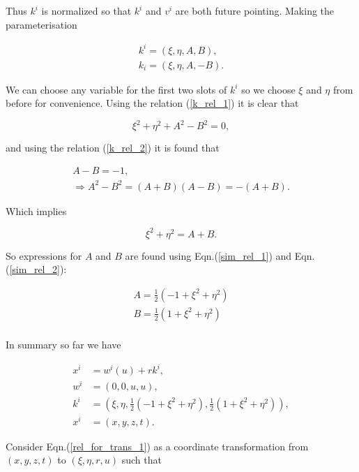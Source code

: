 \noindent Thus $k^i$ is normalized so that $k^i$ and $v^i$ are both future pointing. Making the parameterisation

\begin{gather*}
k^i = (\xi, \eta, A, B), \\
k_i = (\xi, \eta, A, -B).
\end{gather*}

\noindent We can choose any variable for the first two slots of $k^i$ so we choose $\xi$ and $\eta$ from before for convenience. Using the relation (\ref{k_rel_1}) it is clear that

\begin{equation*}
\xi^2 + \eta^2 + A^2 - B^2 = 0,
\end{equation*}

\noindent and using the relation (\ref{k_rel_2}) it is found that

\begin{gather}
A - B = -1 \label{sim_rel_1},\\
\Rightarrow A^2 - B^2 = (A + B)(A - B) = - (A + B).
\end{gather}

\noindent Which implies

\begin{equation}\label{sim_rel_2}
\xi^2 + \eta^2 = A + B. 
\end{equation}

\noindent So expressions for $A$ and $B$ are found using Eqn.(\ref{sim_rel_1}) and Eqn.(\ref{sim_rel_2}):

\begin{eqnarray*}
A = \frac{1}{2} (-1 + \xi^2 + \eta^2) \\
B = \frac{1}{2} (1 + \xi^2 + \eta^2) \\
\end{eqnarray*}

In summary so far we have

\begin{align}
x^i & = w^i (u) + r k^i \label{rel_for_trans_1},\\
w^i & = (0,0, u,u) \label{rel_for_trans_2},\\
k^i & = (\xi, \eta, \frac{1}{2} (-1 + \xi^2 + \eta^2), \frac{1}{2} (1 + \xi^2 + \eta^2)) \label{rel_for_trans_3},\\
x^i & = (x, y, z, t) \label{rel_for_trans_4}.  
\end{align}

Consider Eqn.(\ref{rel_for_trans_1}) as a coordinate transformation from $(x,y,z,t)$ to $(\xi,\eta, r, u )$ such that

